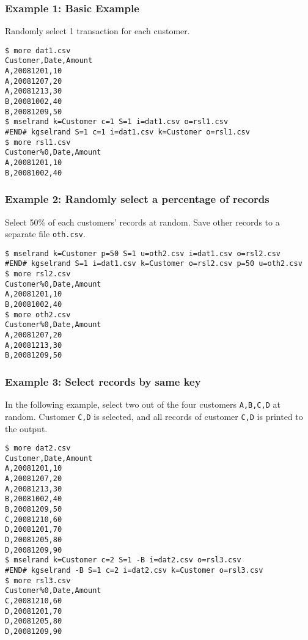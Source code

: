 \subsubsection*{Example 1: Basic Example}

Randomly select 1 transaction for each customer.


\begin{Verbatim}[baselinestretch=0.7,frame=single]
$ more dat1.csv
Customer,Date,Amount
A,20081201,10
A,20081207,20
A,20081213,30
B,20081002,40
B,20081209,50
$ mselrand k=Customer c=1 S=1 i=dat1.csv o=rsl1.csv
#END# kgselrand S=1 c=1 i=dat1.csv k=Customer o=rsl1.csv
$ more rsl1.csv
Customer%0,Date,Amount
A,20081201,10
B,20081002,40
\end{Verbatim}
\subsubsection*{Example 2: Randomly select a percentage of records}

Select 50\% of each customers' records at random. Save other records to a separate file \verb|oth.csv|.


\begin{Verbatim}[baselinestretch=0.7,frame=single]
$ mselrand k=Customer p=50 S=1 u=oth2.csv i=dat1.csv o=rsl2.csv
#END# kgselrand S=1 i=dat1.csv k=Customer o=rsl2.csv p=50 u=oth2.csv
$ more rsl2.csv
Customer%0,Date,Amount
A,20081201,10
B,20081002,40
$ more oth2.csv
Customer%0,Date,Amount
A,20081207,20
A,20081213,30
B,20081209,50
\end{Verbatim}
\subsubsection*{Example 3: Select records by same key}

In the following example, select two out of the four customers \verb|A,B,C,D| at random.
Customer \verb|C,D| is selected, and all records of customer \verb|C,D| is printed to the output.



\begin{Verbatim}[baselinestretch=0.7,frame=single]
$ more dat2.csv
Customer,Date,Amount
A,20081201,10
A,20081207,20
A,20081213,30
B,20081002,40
B,20081209,50
C,20081210,60
D,20081201,70
D,20081205,80
D,20081209,90
$ mselrand k=Customer c=2 S=1 -B i=dat2.csv o=rsl3.csv
#END# kgselrand -B S=1 c=2 i=dat2.csv k=Customer o=rsl3.csv
$ more rsl3.csv
Customer%0,Date,Amount
C,20081210,60
D,20081201,70
D,20081205,80
D,20081209,90
\end{Verbatim}
